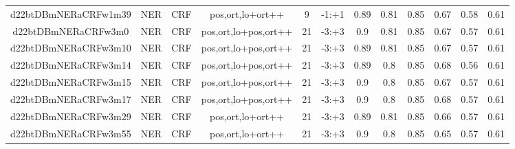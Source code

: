 \documentclass[a4paper]{article}
\begin{document}
\begin{landscape}
\begin{center}
\begin{tabular}{ |c|c|c|c|c|c|c|c|c|c|c|c|}
 		

 	
 
 	
 		
 		\small{ d22btDBmNERaCRFw1m39 } & NER & CRF & pos,ort,lo+ort++  &  9 &  -1:+1  &  0.89 & 0.81 & 0.85  &  0.67 & 0.58 & 0.61 \\
 		

 	
 
 	
 		
 		\small{ d22btDBmNERaCRFw3m0 } & NER & CRF & pos,ort,lo+pos,ort++  &  21 &  -3:+3  &  0.9 & 0.81 & 0.85  &  0.67 & 0.57 & 0.61 \\
 		

 	
 
 	
 		
 		\small{ d22btDBmNERaCRFw3m10 } & NER & CRF & pos,ort,lo+pos,ort++  &  21 &  -3:+3  &  0.89 & 0.81 & 0.85  &  0.67 & 0.57 & 0.61 \\
 		

 	
 
 	
 		
 		\small{ d22btDBmNERaCRFw3m14 } & NER & CRF & pos,ort,lo+pos,ort++  &  21 &  -3:+3  &  0.89 & 0.8 & 0.85  &  0.68 & 0.56 & 0.61 \\
 		

 	
 
 	
 		
 		\small{ d22btDBmNERaCRFw3m15 } & NER & CRF & pos,ort,lo+pos,ort++  &  21 &  -3:+3  &  0.9 & 0.8 & 0.85  &  0.67 & 0.57 & 0.61 \\
 		

 	
 
 	
 		
 		\small{ d22btDBmNERaCRFw3m17 } & NER & CRF & pos,ort,lo+pos,ort++  &  21 &  -3:+3  &  0.9 & 0.8 & 0.85  &  0.68 & 0.57 & 0.61 \\
 		

 	
 
 	
 		
 		\small{ d22btDBmNERaCRFw3m29 } & NER & CRF & pos,ort,lo+ort++  &  21 &  -3:+3  &  0.89 & 0.81 & 0.85  &  0.66 & 0.57 & 0.61 \\
 		

 	
 
 	
 		
 		\small{ d22btDBmNERaCRFw3m55 } & NER & CRF & pos,ort,lo+ort++  &  21 &  -3:+3  &  0.9 & 0.8 & 0.85  &  0.65 & 0.57 & 0.61 \\
 		

 	
 
 	
 		

\end{tabular}
\end{center}
\end{landscape}
\end{document}
